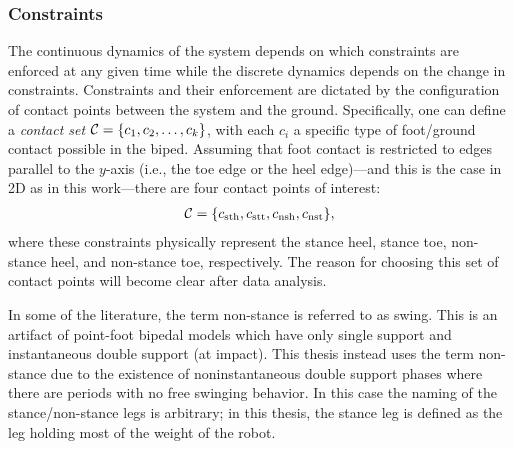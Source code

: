\subsubsection{Constraints}
The continuous dynamics of the system depends on which constraints are enforced
at any given time while the discrete dynamics depends on the change in
constraints.
%
Constraints and their enforcement are dictated by the configuration of contact
points between the system and the ground.
%
Specifically, one can define a {\em contact set} $\mathcal{C} = \{c_{1}, c_{2}, \ldots,
c_{k}\}$, with each $c_{i}$ a specific type of foot/ground contact
possible in the biped.
%
Assuming that foot contact is restricted to edges parallel to the $y$-axis
(i.e., the toe edge or the heel edge)---and this is the case in 2D as in this
work---there are four contact points of interest:
\begin{align*}
  \mathcal{C} =  \{c_{\mathrm{sth}}, c_{\mathrm{stt}}, c_{\mathrm{nsh}} , c_{\mathrm{nst}}\},
\end{align*}
where these constraints physically represent the stance heel, stance toe,
non-stance heel, and non-stance toe, respectively.
%
The reason for choosing this set of contact points will become clear after data
analysis.

\begin{remark}
  In some of the literature, the term non-stance is referred to as swing.
  This is an artifact of point-foot bipedal models which have only single
  support and instantaneous double support (at impact).
  This thesis instead uses the term non-stance due to the existence of
  noninstantaneous double support phases where there are periods with no free
  swinging behavior.
  In this case the naming of the stance/non-stance legs is arbitrary;
  in this thesis, the stance leg is defined as the leg holding most of the
  weight of the robot.
\end{remark}



